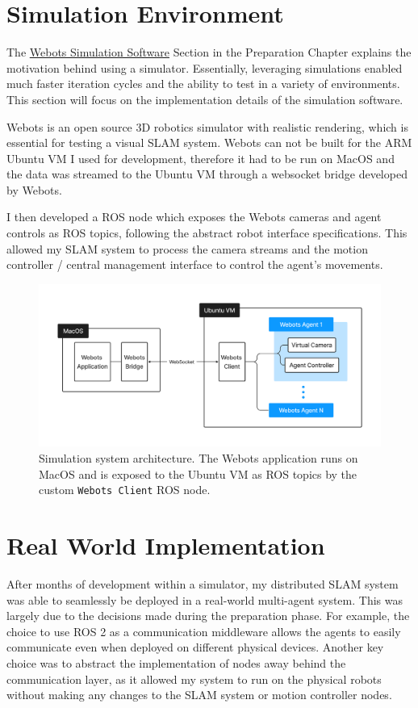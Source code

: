 \section{Simulation Environment}
\label{sec:simulation-environment}
The \hyperref[sec:webots-simulator]{Webots Simulation Software} Section in the Preparation Chapter explains the motivation behind using a simulator. Essentially, leveraging simulations enabled much faster iteration cycles and the ability to test in a variety of environments. This section will focus on the implementation details of the simulation software.

Webots is an open source 3D robotics simulator with realistic rendering, which is essential for testing a visual SLAM system. Webots can not be built for the ARM Ubuntu VM I used for development, therefore it had to be run on MacOS and the data was streamed to the Ubuntu VM through a websocket bridge developed by Webots.

I then developed a ROS node which exposes the Webots cameras and agent controls as ROS topics, following the abstract robot interface specifications. This allowed my SLAM system to process the camera streams and the motion controller / central management interface to control the agent's movements.


\begin{figure}[h]
    \centering
    \includegraphics[trim=5cm 5cm 5cm 5cm, scale=0.2]{figures/simulation_environment.pdf}

    \caption{Simulation system architecture. The Webots application runs on MacOS and is exposed to the Ubuntu VM as ROS topics by the custom \texttt{Webots Client} ROS node.}
    \label{fig:simulation-environment}
\end{figure}

\section{Real World Implementation}
\label{sec:real-world-implementation}
After months of development within a simulator, my distributed SLAM system was able to seamlessly be deployed in a real-world multi-agent system. This was largely due to the decisions made during the preparation phase. For example, the choice to use ROS 2 as a communication middleware allows the agents to easily communicate even when deployed on different physical devices. Another key choice was to abstract the implementation of nodes away behind the communication layer, as it allowed my system to run on the physical robots without making any changes to the SLAM system or motion controller nodes.


